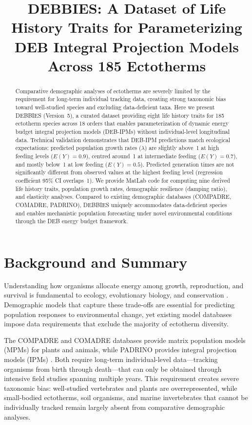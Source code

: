 \documentclass[11pt]{article}
\title{DEBBIES: A Dataset of Life History Traits for Parameterizing DEB Integral Projection Models Across 185 Ectotherms}
\author{}
\date{}
\begin{document}
\maketitle

\begin{abstract}
Comparative demographic analyses of ectotherms are severely limited by the requirement for long-term individual tracking data, creating strong taxonomic bias toward well-studied species and excluding data-deficient taxa. Here we present DEBBIES (Version~5), a curated dataset providing eight life history traits for 185 ectotherm species across 18 orders that enables parameterization of dynamic energy budget integral projection models (DEB-IPMs) without individual-level longitudinal data. Technical validation demonstrates that DEB-IPM predictions match ecological expectations: predicted population growth rates ($\lambda$) are slightly above~1 at high feeding levels ($E(Y) = 0.9$), centred around~1 at intermediate feeding ($E(Y) = 0.7$), and mostly below~1 at low feeding ($E(Y) = 0.5$). Predicted generation times are not significantly different from observed values at the highest feeding level (regression coefficient 95\% CI overlaps~1). We provide MatLab code for computing nine derived life history traits, population growth rates, demographic resilience (damping ratio), and elasticity analyses. Compared to existing demographic databases (COMPADRE, COMADRE, PADRINO), DEBBIES uniquely accommodates data-deficient species and enables mechanistic population forecasting under novel environmental conditions through the DEB energy budget framework.
\end{abstract}

\section{Background and Summary}

Understanding how organisms allocate energy among growth, reproduction, and survival is fundamental to ecology, evolutionary biology, and conservation \citep{stearns1992evolution,kooijman2010dynamic}. Demographic models that capture these trade-offs are essential for predicting population responses to environmental change, yet existing model databases impose data requirements that exclude the majority of ectotherm diversity.

The COMPADRE and COMADRE databases provide matrix population models (MPMs) for plants and animals, while PADRINO provides integral projection models (IPMs) \citep{salguero2015compadre,jones2022rpadrino}. Both require long-term individual-level data---tracking organisms from birth through death---that can only be obtained through intensive field studies spanning multiple years. This requirement creates severe taxonomic bias: well-studied vertebrates and plants are overrepresented, while small-bodied ectotherms, soil organisms, and marine invertebrates that cannot be individually tracked remain largely absent from comparative demographic analyses.
\end{document}
